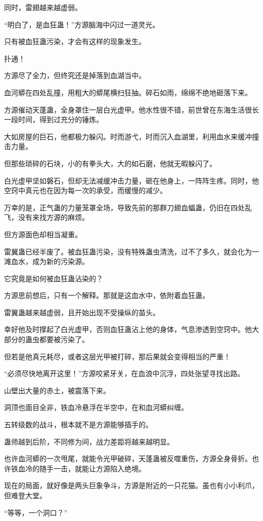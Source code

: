 \begin{this_body}
同时，雷翅越来越虚弱。

“明白了，是血狂蛊！”方源脑海中闪过一道灵光。

只有被血狂蛊污染，才会有这样的现象发生。

扑通！

方源尽了全力，但终究还是掉落到血湖当中。

血河蟒在四处乱撞，用粗大的蟒尾横扫狂抽。碎石如雨，绵绵不绝地砸落下来。

方源催动天蓬蛊，全身罩住一层白光虚甲。他水性很不错，前世曾在东海生活很长一段时间，得到过充分的锤炼。

大如房屋的巨石，他都极力躲闪。时而游弋，时而沉入血湖里，利用血水来缓冲撞击力量。

但那些琐碎的石块，小的有拳头大，大的如石磨，他就无暇躲闪了。

白光虚甲坚如磐石，但却无法减缓冲击力量，砸在他身上，一阵阵生疼。同时，他空窍中真元也在因为每一次的承受，而缓慢的减少。

万幸的是，正气蛊的力量笼罩全场，导致先前的那群刀翅血蝠蛊，仍旧在四处乱飞，没有来找方源的麻烦。

但方源面色却相当凝重。

雷翼蛊已经半废了。被血狂蛊污染，没有特殊蛊虫清洗，过不了多久，就会化为一滩血水，成为新的污染源。

它究竟是如何被血狂蛊沾染的？

方源思前想后，只有一个解释。那就是这血水中，依附着血狂蛊。

雷翼蛊越来越虚弱，且开始出现不受操纵的苗头。

幸好他及时撑起了白光虚甲，否则血狂蛊沾上他的身体，气息渗透到空窍中。他大部分的蛊虫都要被污染了。

但若是他真元耗尽，或者这层光甲被打碎，那后果就会变得相当的严重！

“必须尽快地离开这里！”方源咬紧牙关，在血浪中沉浮，四处张望寻找出路。

山壁出大量的赤土，被震落下来。

洞顶也面目全非，铁血冷悬浮在半空中，在和血河蟒纠缠。

五转级数的战斗，根本就不是方源能够插手的。

蛊师越到后阶，不同修为间，战力差距将越来越明显。

也许血河蟒的一次甩尾，就能令光甲破碎，天蓬蛊被反噬重伤，方源全身骨折。也许铁血冷的随手一击，就能让方源陷入绝境。

现在的局面，就好像是两头巨象争斗，方源是附近的一只花猫。虽也有小小利爪，但难登大堂。

“等等，一个洞口？”

\end{this_body}

